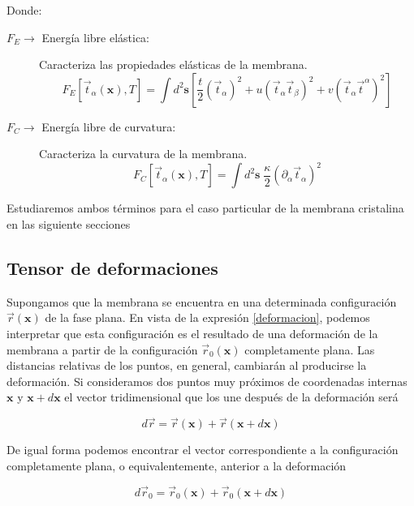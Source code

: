 Donde:
\begin{description}
\item[ $F_E\rightarrow $ Energía libre elástica:] Caracteriza las propiedades elásticas de la membrana.
  \begin{equation}
    F_E[\vec{t}_{\alpha}(\mathbf{x}),T]=\int d^2\mathbf{s}
    \left[
      \frac{t}{2}(\vec{t}_{\alpha})^2+
      u(\vec{t}_{\alpha}\vec{t}_{\beta})^2+
      v(\vec{t}_{\alpha}\vec{t}^{\alpha})^2
    \right]
  \end{equation}
\item[ $F_C\rightarrow $ Energía libre de curvatura:] Caracteriza la curvatura
  de la membrana. 
  \begin{equation}
       F_C[\vec{t}_{\alpha}(\mathbf{x}),T]=\int d^2\mathbf{s}\; 
      \frac{\kappa}{2}(\partial_{\alpha}\vec{t}_{\alpha})^2
  \end{equation}
\end{description}

Estudiaremos ambos términos para el caso particular de la membrana cristalina
en las siguiente secciones

\subsection{Tensor de deformaciones}

Supongamos que la membrana se encuentra en una determinada configuración
$\vec{r}(\mathbf{x})$ de la fase plana. En vista de la expresión
\eqref{deformacion}, podemos interpretar que esta configuración es el
resultado de una deformación de la membrana a partir de la configuración
$\vec{r}_0(\mathbf{x})$ completamente plana. Las distancias relativas de los
puntos, en general, cambiarán al producirse la deformación. Si
consideramos dos puntos muy próximos de coordenadas internas
$\mathbf{x}$ y $\mathbf{x}+d\mathbf{x}$ el vector tridimensional que los une
después de la deformación será

\begin{equation*}\label{dr}
d\vec{r}= \vec{r}(\mathbf{x})+\vec{r}(\mathbf{x}+d\mathbf{x})
\end{equation*}

De igual forma podemos encontrar el vector correspondiente a la configuración
completamente plana, o equivalentemente, anterior a la deformación

\begin{equation}\label{dr0}
d\vec{r}_0= \vec{r}_0(\mathbf{x})+\vec{r}_0(\mathbf{x}+d\mathbf{x})
\end{equation}

